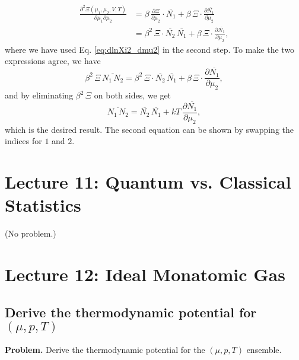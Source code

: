 \documentclass[twocolumn, 10pt]{article}
\numberwithin{equation}{section}
\newenvironment{problem}
{\par\medskip\sffamily \color{problue}
  \textbf{Problem. }\ignorespaces}
{\medskip}
\newenvironment{solution}[1][\empty]
{\par\medskip
  \textbf{\ifx\empty#1{Solution.}\relax\else{#1}\fi} \ignorespaces}
{\medskip}
\begin{document}
\begin{solution}
\begin{align*}
  \frac{ \partial^2 \Xi(\mu_1, \mu_2, V, T) }
       { \partial \mu_1 \partial \mu_2 }
  &=
    \beta \, \frac{ \partial \Xi } { \partial \mu_2 } \cdot
    \overline{ N_1 }
    +
    \beta \, \Xi \cdot
    \frac{ \partial \overline{ N_1 } } { \partial \mu_2 }
  \\
  &=
    \beta^2 \, \Xi \cdot
    \overline{ N_2 } \, \overline{ N_1 }
    +
    \beta \, \Xi \cdot
    \frac{ \partial \overline{ N_1 } } { \partial \mu_2 }
  ,
\end{align*}
%
where we have used Eq. \eqref{eq:dlnXi2_dmu2} in the second step.
To make the two expressions agree, we have
$$
  \beta^2 \, \Xi \, \overline{ N_1 \, N_2 }
  =
  \beta^2 \, \Xi \cdot
  \overline{ N_2 } \, \overline{ N_1 }
  +
  \beta \, \Xi \cdot
  \frac{ \partial \overline{ N_1 } } { \partial \mu_2 }
  ,
$$
and by eliminating $\beta^2 \, \Xi$
on both sides, we get
$$
  \overline{ N_1 \, N_2 }
  =
  \overline{ N_2 } \, \overline{ N_1 }
  +
  kT \,
  \frac{ \partial \overline{ N_1 } } { \partial \mu_2 }
  ,
$$
%
which is the desired result.
%
The second equation can be shown by swapping the indices for $1$ and $2$.
\end{solution}




\section{Lecture 11: Quantum vs. Classical Statistics}

(No problem.)

\section{Lecture 12: Ideal Monatomic Gas}

\subsection{Derive the thermodynamic potential for $(\mu, p, T)$}

\begin{problem}
Derive the thermodynamic potential for the $(\mu, p, T)$ ensemble.
\end{problem}
\end{document}
